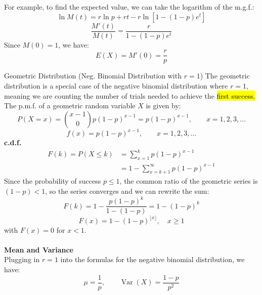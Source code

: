 ﻿\documentclass[12pt]{article}
\begin{document}
For example, to find the expected value, we can take the logarithm of the m.g.f.:
\[
\ln M(t)=r\ln p+rt-r\ln[1-(1-p)e^t]
\]
\[
\frac{M'(t)}{M(t)}=\frac{r}{1-(1-p)e^t}
\]
Since \(M(0)=1\), we have:
\[
E(X)=M'(0)=\frac rp
\]
\begin{definition}{Geometric Distribution (Neg. Binomial Distribution with $r=1$)}
The geometric distribution is a special case of the negative binomial distribution where $r=1$, meaning we are counting the number of trials needed to achieve the \hl{first success.} The p.m.f. of a geometric random variable $X$ is given by:
\[
P(X=x)=\binom{x-1}{0}p(1-p)^{x-1}=p(1-p)^{x-1},\qquad x=1,2,3,\dots
\]
\[\boxed{f(x)=p(1-p)^{x-1},\qquad x=1,2,3,\dots}\]
\textbf{c.d.f.}
\[
\begin{aligned}
    F(k) = P(X \leq k) &= \sum_{x=1}^{k} p(1-p)^{x-1} \\
    &= 1 - \sum_{x=k+1}^{\infty} p(1-p)^{x-1} 
\end{aligned}
\]
Since the probability of success $p\leq 1$, the common ratio of the geometric series is \\$(1-p)<1$, so the series converges and we can rewrite the sum:
\[F(k) = 1 - \frac{p(1-p)^k}{1-(1-p)} = 1 - (1-p)^k\]
\[
\boxed{F(x)=1-(1-p)^{\lfloor x\rfloor},\quad x\geq1}
\]
with \(F(x)=0\) for \(x<1\).\\\\
\textbf{Mean and Variance}\\
Plugging in $r=1$ into the formulas for the negative binomial distribution, we have:
\[
\boxed{\mu=\frac1p,\qquad \operatorname{Var}(X)=\frac{1-p}{p^2}}
\]
\end{definition}
\end{document}
